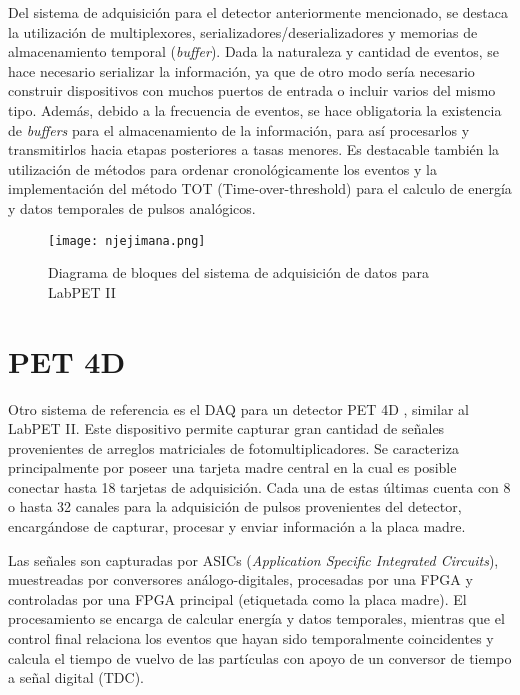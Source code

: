 	Del sistema de adquisición para el detector anteriormente mencionado, se destaca la utilización de multiplexores, serializadores/deserializadores y memorias de almacenamiento temporal (\textit{buffer}). Dada la naturaleza y cantidad de eventos, se hace necesario serializar la información, ya que de otro modo sería necesario construir dispositivos con muchos puertos de entrada o incluir varios del mismo tipo. Además, debido a la frecuencia de eventos, se hace obligatoria la existencia de \textit{buffers} para el almacenamiento de la información, para así procesarlos y transmitirlos hacia etapas posteriores a tasas menores. Es destacable también la utilización de métodos para ordenar cronológicamente los eventos y la implementación del método TOT (Time-over-threshold) para el calculo de energía y datos temporales de pulsos analógicos. 
	
	\begin{figure}[h]
		\centering
		\texttt{[image: njejimana.png]}
		\caption{Diagrama de bloques del sistema de adquisición de datos para LabPET II \cite{Njejimana2013DesignImaging}}
		\label{fig:njejimana}
	\end{figure}
	
\newpage
\section{PET 4D}
	
	Otro sistema de referencia es el DAQ para un detector PET 4D \cite{Marcatili2011DevelopmentDetector}, similar al LabPET II. Este dispositivo permite capturar gran cantidad de señales provenientes de arreglos matriciales de fotomultiplicadores. Se caracteriza principalmente por poseer una tarjeta madre central en la cual es posible conectar hasta 18 tarjetas de adquisición. Cada una de estas últimas cuenta con 8 o hasta 32 canales para la adquisición de pulsos provenientes del detector, encargándose de capturar, procesar y enviar información a la placa madre.
	
	Las señales son capturadas por ASICs (\textit{Application Specific Integrated Circuits}), muestreadas por conversores análogo-digitales, procesadas por una FPGA y controladas por una FPGA principal (etiquetada como la placa madre). El procesamiento se encarga de calcular energía y datos temporales, mientras que el control final relaciona los eventos que hayan sido temporalmente coincidentes y calcula el tiempo de vuelvo de las partículas con apoyo de un conversor de tiempo a señal digital (TDC).
	
